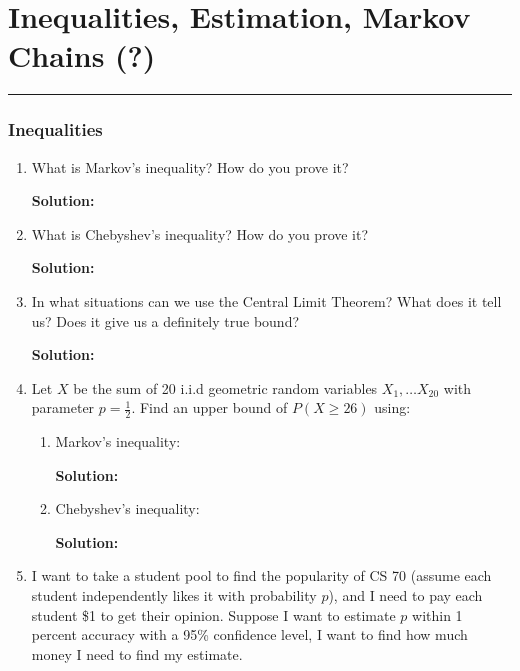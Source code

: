 \documentclass{article}
\newenvironment{solution}{

            \color{blue} \smallskip \textbf{Solution:}}{}
\begin{document}
    
    \part*{Inequalities, Estimation, Markov Chains (?)}
    \vspace{-7pt}
    \hrule
    \vspace{7pt}
    \section{Inequalities}
    \begin{enumerate}
        \item What is Markov's inequality? How do you prove it?
        \begin{solution}
        \end{solution}
        \item What is Chebyshev's inequality? How do you prove it?
        \begin{solution}
        \end{solution}
        \item In what situations can we use the Central Limit Theorem? What does it tell us? Does it give us a definitely true bound?
        \begin{solution}
        \end{solution}
        \item Let $X$ be the sum of 20 i.i.d geometric random variables $X_1, \ldots X_{20}$ with parameter $p = \frac{1}{2}$. Find an upper bound of $P(X \geq 26)$ using:
        \begin{enumerate}
            \item Markov's inequality:
            \begin{solution}
            \end{solution}
            \item Chebyshev's inequality:
            \begin{solution}
            \end{solution}
        \end{enumerate}
        \item I want to take a student pool to find the popularity of CS 70 (assume each student independently likes it with probability $p$), and I need to pay each student \$1 to get
        their opinion. Suppose I want to estimate $p$ within 1 percent accuracy with a 95\% confidence level, I want to find how much money I need to
        find my estimate.
        \begin{enumerate}

\end{enumerate}
\end{enumerate}
\end{document}
